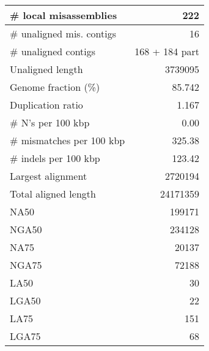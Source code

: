 \documentclass[12pt,a4paper]{article}
\begin{document}
\begin{table}[ht]
\begin{center}
\begin{tabular}{|l*{1}{|r}|}
\# local misassemblies & 222 \\ \hline
\# unaligned mis. contigs & 16 \\ \hline
\# unaligned contigs & 168 + 184 part \\ \hline
Unaligned length & 3739095 \\ \hline
Genome fraction (\%) & 85.742 \\ \hline
Duplication ratio & 1.167 \\ \hline
\# N's per 100 kbp & 0.00 \\ \hline
\# mismatches per 100 kbp & 325.38 \\ \hline
\# indels per 100 kbp & 123.42 \\ \hline
Largest alignment & 2720194 \\ \hline
Total aligned length & 24171359 \\ \hline
NA50 & 199171 \\ \hline
NGA50 & 234128 \\ \hline
NA75 & 20137 \\ \hline
NGA75 & 72188 \\ \hline
LA50 & 30 \\ \hline
LGA50 & 22 \\ \hline
LA75 & 151 \\ \hline
LGA75 & 68 \\ \hline
\end{tabular}
\end{center}
\end{table}
\end{document}
